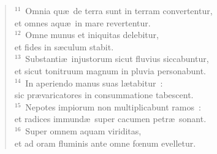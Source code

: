\begin{flushleft}\begin{verse}${}^{11}$~Omnia qu\ae\ de terra sunt in terram convertentur,\\ et omnes aqu\ae\ in mare revertentur.\\
${}^{12}$~Omne munus et iniquitas delebitur,\\ et fides in s\ae culum stabit.\\
${}^{13}$~Substanti\ae\ injustorum sicut fluvius siccabuntur,\\ et sicut tonitruum magnum in pluvia personabunt.\\
${}^{14}$~In aperiendo manus suas l\ae tabitur~:\\ sic pr\ae varicatores in consummatione tabescent.\\
${}^{15}$~Nepotes impiorum non multiplicabunt ramos~:\\ et radices immund\ae\ super cacumen petr\ae\ sonant.\\
${}^{16}$~Super omnem aquam viriditas,\\ et ad oram fluminis ante omne fœnum evelletur.\end{verse}\end{flushleft}


